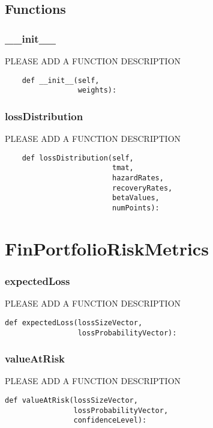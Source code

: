 \documentclass[twoside,11pt]{book}
\begin{document}
\subsection*{Functions}

\subsubsection*{{\bf \_\_init\_\_}}
PLEASE ADD A FUNCTION DESCRIPTION

\begin{lstlisting}
    def __init__(self,
                 weights):
\end{lstlisting}

\subsubsection*{{\bf lossDistribution}}
PLEASE ADD A FUNCTION DESCRIPTION

\begin{lstlisting}
    def lossDistribution(self,
                         tmat,
                         hazardRates,
                         recoveryRates,
                         betaValues,
                         numPoints):
\end{lstlisting}

\newpage
\section{FinPortfolioRiskMetrics}

\subsubsection*{{\bf expectedLoss}}
PLEASE ADD A FUNCTION DESCRIPTION

\begin{lstlisting}
def expectedLoss(lossSizeVector,
                 lossProbabilityVector):
\end{lstlisting}

\subsubsection*{{\bf valueAtRisk}}
PLEASE ADD A FUNCTION DESCRIPTION

\begin{lstlisting}
def valueAtRisk(lossSizeVector,
                lossProbabilityVector,
                confidenceLevel):
\end{lstlisting}
\end{document}
